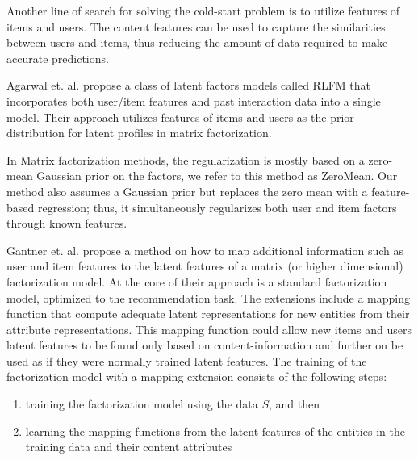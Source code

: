 Another line of search for solving the cold-start problem is to utilize
features of items and users. The content features can be used to capture the
similarities between users and items, thus reducing the amount of data required
to make accurate predictions.


Agarwal et. al. \cite{Agarwal2009} propose a class of latent factors models
called RLFM that incorporates both user/item features and past interaction data
into a single model. Their approach utilizes features of items and users as the
prior distribution for latent profiles in matrix factorization.

In Matrix factorization methods, the regularization is mostly based on a
zero-mean Gaussian prior on the factors, we refer to this method as ZeroMean.
Our method also assumes a Gaussian prior but replaces the zero mean with a
feature-based regression; thus, it simultaneously regularizes both user and
item factors through known features.


Gantner et. al. \cite{Ganter2010} propose a method on how to map additional
information such as user and item features to the latent features of a matrix
(or higher dimensional) factorization model. At the core of their approach is a
standard factorization model, optimized to the recommendation task. The
extensions include a mapping function that compute adequate latent
representations for new entities from their attribute representations. This
mapping function could allow new items and users latent features to be found
only based on content-information and further on be used as if they were
normally trained latent features. The training of the factorization model with
a mapping extension consists of the following steps:

\begin{enumerate}
\item training the factorization model using the data $S$, and then
\item learning the mapping functions from the latent features of the entities in the training data and their content attributes
\end{enumerate}

